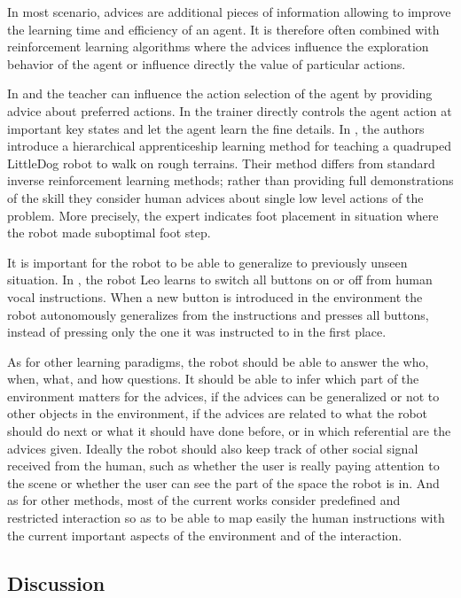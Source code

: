 In most scenario, advices are additional pieces of information allowing to improve the learning time and efficiency of an agent. It is therefore often combined with reinforcement learning algorithms where the advices influence the exploration behavior of the agent or influence directly the value of particular actions. 

In \cite{clouse1992teaching} and \cite{maclin2005giving} the teacher can influence the action selection of the agent by providing advice about preferred actions. In  \cite{smart2002effective} the trainer directly controls the agent action at important key states and let the agent learn the fine details. In \cite{kolter2007hierarchical}, the authors introduce a hierarchical apprenticeship learning method for teaching a quadruped LittleDog robot to walk on rough terrains. Their method differs from standard inverse reinforcement learning methods; rather than providing full demonstrations of the skill they consider human advices about single low level actions of the problem. More precisely, the expert indicates foot placement in situation where the robot made suboptimal foot step.

It is important for the robot to be able to generalize to previously unseen situation. In \cite{lockerd2004tutelage}, the robot Leo learns to switch all buttons on or off from human vocal instructions. When a new button is introduced in the environment the robot autonomously generalizes from the instructions and presses all buttons, instead of pressing only the one it was instructed to in the first place.


As for other learning paradigms, the robot should be able to answer the who, when, what, and how questions. It should be able to infer which part of the environment matters for the advices, if the advices can be generalized or not to other objects in the environment, if the advices are related to what the robot should do next or what it should have done before, or in which referential are the advices given. Ideally the robot should also keep track of other social signal received from the human, such as whether the user is really paying attention to the scene or whether the user can see the part of the space the robot is in. And as for other methods, most of the current works consider predefined and restricted interaction so as to be able to map easily the human instructions with the current important aspects of the environment and of the interaction.

\subsection{Discussion}

